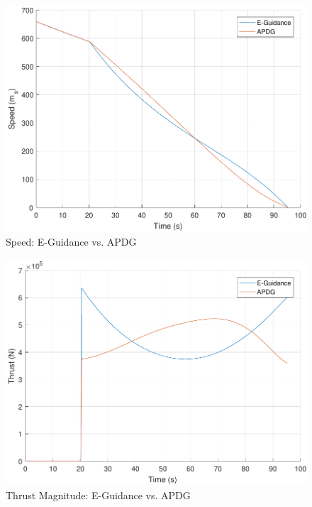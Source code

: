 \begin{figure}[H]
	\centering
	\begin{minipage}{4.5 in}
		\includegraphics[width=\linewidth]{Figures/spdEvsAPDG.pdf}
		\caption{Speed: E-Guidance vs. APDG \label{fig:spdEvsAPDG} }
	\end{minipage}
\end{figure}

\begin{figure}[H]
	\centering
	\begin{minipage}{4.5 in}
		\includegraphics[width=\linewidth]{Figures/thrEvsAPDG.pdf}
		\caption{Thrust Magnitude: E-Guidance vs. APDG \label{fig:thrEvsAPDG} }
	\end{minipage}
\end{figure}

